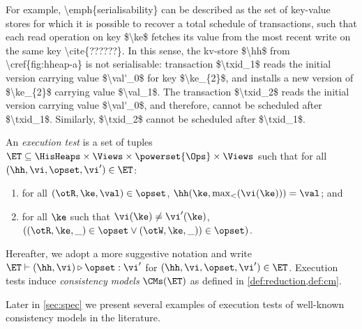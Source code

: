 \ac{
For example, \emph{serialisability} can be described as the set 
of key-value stores for which it is possible to recover a total schedule of transactions, 
such that each read operation on key $\ke$ fetches its value from the 
most recent write on the same key \cite{??????}.
In this sense, the kv-store $\hh$ from \cref{fig:hheap-a} is not serialisable: 
transaction $\txid_1$ reads the initial version carrying value $\val'_0$ for key $\ke_{2}$, 
and installs a new version of $\ke_{2}$ carrying value $\val_1$. The transaction $\txid_2$ 
reads the initial version carrying value $\val'_0$, and therefore, 
cannot be scheduled after $\txid_1$. Similarly, $\txid_2$ cannot be scheduled after $\txid_1$.
}

\begin{definition}
\label{def:execution.test}
An \emph{execution test} is a set of tuples $\ET \subseteq \HisHeaps \times \Views \times \powerset{\Ops} \times \Views$ 
such that for all $(\hh, \vi, \opset, \vi') \in \ET$:
\begin{enumerate}
	\item for all $(\otR, \ke, \val) \in \opset$,  $\hh(\ke, \max_{<}(\vi(\ke))) = \val$; and
	\item for all $\ke$ such that $\vi(\ke) \neq \vi'(\ke)$, 
	$( (\otR, \ke, \_) \in \opset \vee (\otW, \ke, \_)) \in \opset)$.
\end{enumerate}
\end{definition}


Hereafter, we adopt a more suggestive notation and write $\ET \vdash (\hh, \vi) \triangleright \opset: \vi'$ 
for $(\hh, \vi, \opset, \vi') \in \ET$.
Execution tests induce \emph{consistency models} \( \CMs(\ET) \) as defined in \cref{def:reduction,def:cm}.

Later in \cref{sec:spec} we present several examples of execution tests of well-known consistency models in the literature. 


